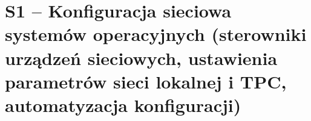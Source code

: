 \section{S1 -- Konfiguracja sieciowa systemów operacyjnych (sterowniki urządzeń sieciowych, ustawienia parametrów sieci lokalnej i TPC, automatyzacja konfiguracji)}
